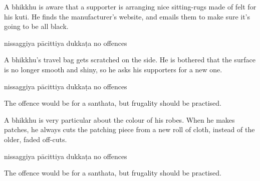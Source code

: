 \begin{exam}{\autoExamName}
\begin{problem*}
\begin{parts}
      \item A bhikkhu is aware that a supporter is arranging nice sitting-rugs
      made of felt for his kuti. He finds the manufacturer's website, and emails
      them to make sure it's going to be all black.

      \bigskip

      \begin{answers}{3}
        \bChoices
         nissaggiya pācittiya\eAns
         dukkaṭa\eAns
         no offences\eAns
        \eChoices
      \end{answers}

      \bigskip

      \item A bhikkhu's travel bag gets scratched on the side. He is bothered
      that the surface is no longer smooth and shiny, so he asks his supporters
      for a new one.

      \bigskip

      \begin{answers}{3}
        \bChoices
         nissaggiya pācittiya\eAns
         dukkaṭa\eAns
         no offences\eAns
        \eChoices
      \end{answers}

      \begin{solution}
        The offence would be for a santhata, but frugality should be practised.
      \end{solution}

      \bigskip

      \item A bhikkhu is very particular about the colour of his robes. When he
      makes patches, he always cuts the patching piece from a new roll of cloth,
      instead of the older, faded off-cuts.

      \bigskip

      \begin{answers}{3}
        \bChoices
         nissaggiya pācittiya\eAns
         dukkaṭa\eAns
         no offences\eAns
        \eChoices
      \end{answers}

      \begin{solution}
        The offence would be for a santhata, but frugality should be practised.
      \end{solution}

    \end{parts}

  \end{problem*}

\end{exam}
